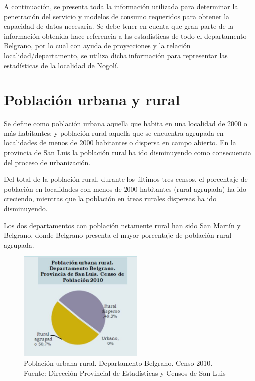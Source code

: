 \documentclass[12pt,a4paper]{book}
\begin{document}
\medskip 

A continuación, se presenta toda la información utilizada para determinar la penetración del servicio y modelos de consumo requeridos para obtener la capacidad de datos necesaria. Se debe tener en cuenta que gran parte de la información obtenida hace referencia a las estadísticas de todo el departamento Belgrano, por lo cual con ayuda de proyecciones y la relación localidad/departamento, se utiliza dicha información para representar las estadísticas de la localidad de Nogolí.

\section{Población urbana y rural}

Se define como población urbana aquella que habita en una localidad de 2000 o más habitantes; y población rural aquella que se encuentra agrupada en localidades de menos de 2000 habitantes o dispersa en campo abierto. En la provincia de San Luis la población rural ha ido disminuyendo como consecuencia del proceso de urbanización.

\medskip 

Del total de la población rural, durante los últimos tres censos, el porcentaje de población en localidades con menos de 2000 habitantes (rural agrupada) ha ido creciendo, mientras que la población en áreas rurales dispersas ha ido disminuyendo.

\medskip 

Los dos departamentos con población netamente rural han sido San Martín y Belgrano, donde Belgrano presenta el mayor porcentaje de población rural agrupada.

\begin{figure} [H]
\centering
\includegraphics[width= 6cm]{../figuras/4_1_Fig1.jpg}
\caption{Población urbana-rural. Departamento Belgrano. Censo 2010. Fuente: Dirección Provincial de Estadísticas y Censos de San Luis}
\label{fig_pob_urbRur_dem}
\end{figure}	
\end{document}
